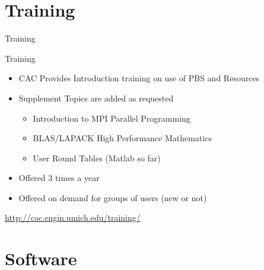 \documentclass[handout]{beamer}
\begin{document}
  \section {Training}
     \begin{frame}{Training}
      \begin{block}{Training}
       \begin{itemize}
        \item CAC Provides Introduction training on use of PBS and Resources
        \item Supplement Topics are added as requested
        \begin{itemize}
         \item Introduction to MPI Parallel Programming
         \item BLAS/LAPACK High Performance Mathematics
         \item User Round Tables (Matlab so far)
        \end{itemize}
        \item Offered 3 times a year
        \item Offered on demand for groups of users (new or not)
       \end{itemize}
      \end{block}
      \url{http://cac.engin.umich.edu/training/}
     \end{frame}
  \section {Software}
\end{document}
